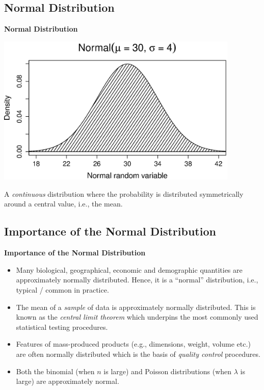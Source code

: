 \documentclass[compress]{beamer}        %
\makeatletter
\newcommand{\tcb}{\textcolor{beamer@blendedblue}}
\makeatother
\begin{document}
\subsection{Normal Distribution}
\begin{frame}{\bf \tcb{Normal Distribution}\\[-1.1cm]}

\begin{center}
\includegraphics[width=0.87\textwidth, trim = 0.0cm 0.5cm 0.3cm 0.5cm, clip]{Normal}
\end{center}

A \emph{continuous} distribution where the probability is distributed symmetrically around a central value, i.e., the mean.

\end{frame}



\subsection{Importance of the Normal Distribution}
\begin{frame}{\bf \tcb{Importance of the Normal Distribution}}
\begin{itemize}\itemsep0.6cm
\item Many biological, geographical, economic and demographic quantities are approximately normally distributed. Hence, it is a ``normal'' distribution, i.e., typical / common in practice.
\item The mean of a \emph{sample} of data is approximately normally distributed. This is known as the \emph{central limit theorem} which underpins the most commonly used statistical testing procedures.
\item Features of mass-produced products (e.g., dimensions, weight, volume etc.) are often normally distributed which is the basis of \emph{quality control} procedures.
\item Both the binomial (when $n$ is large) and Poisson distributions (when $\lambda$ is large) are approximately normal.
\end{itemize}


\end{frame}
\end{document}
